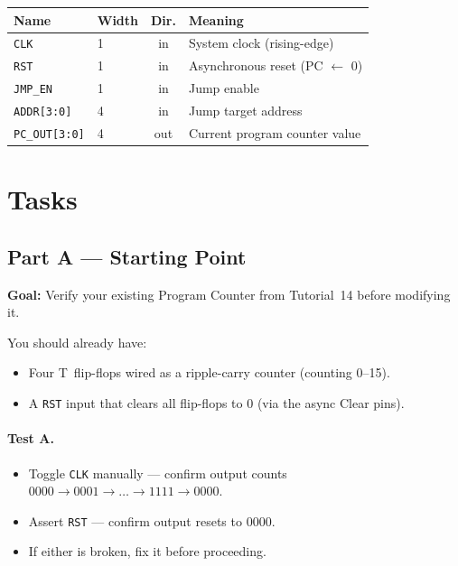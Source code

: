 \documentclass[11pt,a4paper]{article}
\newcommand{\signal}[1]{\texttt{#1}}
\begin{document}
\begin{center}
\renewcommand{\arraystretch}{1.2}
\begin{tabular}{llcl}
  \toprule
  \textbf{Name} & \textbf{Width} & \textbf{Dir.} & \textbf{Meaning} \\
  \midrule
  \signal{CLK}       & 1 & in  & System clock (rising-edge) \\
  \signal{RST}       & 1 & in  & Asynchronous reset (PC $\leftarrow$ 0) \\
  \signal{JMP\_EN}   & 1 & in  & Jump enable \\
  \signal{ADDR[3:0]} & 4 & in  & Jump target address \\
  \signal{PC\_OUT[3:0]} & 4 & out & Current program counter value \\
  \bottomrule
\end{tabular}
\end{center}

\section{Tasks}

\subsection{Part A --- Starting Point}

\textbf{Goal:} Verify your existing Program Counter from Tutorial~14 before
modifying it.

You should already have:
\begin{itemize}[leftmargin=2em]
  \item Four T~flip-flops wired as a ripple-carry counter (counting 0--15).
  \item A \signal{RST} input that clears all flip-flops to 0 (via the async
        Clear pins).
\end{itemize}

\paragraph{Test A.}
\begin{itemize}
  \item Toggle \signal{CLK} manually --- confirm output counts
        $0000 \to 0001 \to \ldots \to 1111 \to 0000$.
  \item Assert \signal{RST} --- confirm output resets to $0000$.
  \item If either is broken, fix it before proceeding.
\end{itemize}
\end{document}
